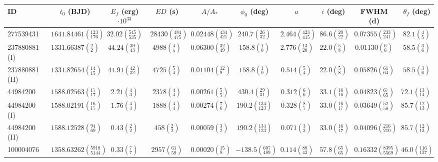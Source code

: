\begin{tabular}{lccccccccr}
\hline\hline
             ID &                              $t_0$ (BJD) &      $E_{f}$ (erg)$\cdot 10^{33}$ &                          $ED$ (s) &                             $A/A_*$ &                     $\phi_0$ (deg) &                               $a$ &                      $i$ (deg) &                              FWHM (d) &                 $\theta_f$ (deg) \\
\hline
      277539431 &    $1641.84461\left(^{123}_{176}\right)$ &  $32.02\left(^{545}_{535}\right)$ &  $28430\left(^{484}_{475}\right)$ &  $0.02448\left(^{434}_{421}\right)$ &     $240.7\left(^{26}_{32}\right)$ &  $2.464\left(^{423}_{415}\right)$ &  $86.6\left(^{20}_{22}\right)$ &    $0.07355\left(^{233}_{241}\right)$ &      $82.1\left(^{4}_{5}\right)$ \\
  237880881 (I) &        $1331.66387\left(^{2}_{2}\right)$ &    $44.24\left(^{39}_{43}\right)$ &       $4988\left(^{4}_{5}\right)$ &    $0.06300\left(^{32}_{49}\right)$ &       $158.8\left(^{1}_{0}\right)$ &    $2.776\left(^{13}_{20}\right)$ &    $22.0\left(^{5}_{8}\right)$ &        $0.01130\left(^{6}_{6}\right)$ &      $58.5\left(^{3}_{6}\right)$ \\
 237880881 (II) &      $1331.82654\left(^{14}_{15}\right)$ &    $41.91\left(^{42}_{32}\right)$ &       $4725\left(^{5}_{4}\right)$ &     $0.01104\left(^{12}_{9}\right)$ &       $158.8\left(^{1}_{0}\right)$ &      $0.514\left(^{5}_{4}\right)$ &    $22.0\left(^{5}_{8}\right)$ &      $0.05826\left(^{61}_{64}\right)$ &      $58.5\left(^{3}_{6}\right)$ \\
       44984200 &      $1588.02563\left(^{17}_{17}\right)$ &       $2.21\left(^{4}_{3}\right)$ &       $2378\left(^{4}_{4}\right)$ &      $0.00261\left(^{5}_{5}\right)$ &     $430.4\left(^{29}_{31}\right)$ &      $0.312\left(^{6}_{6}\right)$ &  $33.1\left(^{16}_{16}\right)$ &      $0.04823\left(^{67}_{65}\right)$ &    $72.1\left(^{13}_{14}\right)$ \\
   44984200 (I) &      $1588.02191\left(^{16}_{17}\right)$ &       $1.76\left(^{4}_{4}\right)$ &       $1888\left(^{4}_{4}\right)$ &      $0.00274\left(^{7}_{6}\right)$ &   $190.2\left(^{134}_{123}\right)$ &      $0.328\left(^{8}_{7}\right)$ &  $33.0\left(^{16}_{17}\right)$ &      $0.03649\left(^{52}_{58}\right)$ &    $85.7\left(^{12}_{13}\right)$ \\
  44984200 (II) &      $1588.12528\left(^{94}_{69}\right)$ &       $0.43\left(^{2}_{2}\right)$ &        $458\left(^{2}_{2}\right)$ &      $0.00059\left(^{3}_{2}\right)$ &   $190.2\left(^{134}_{123}\right)$ &      $0.071\left(^{3}_{3}\right)$ &  $33.0\left(^{16}_{17}\right)$ &    $0.04096\left(^{216}_{210}\right)$ &    $85.7\left(^{12}_{13}\right)$ \\
      100004076 &  $1358.63262\left(^{5918}_{5144}\right)$ &       $0.33\left(^{7}_{7}\right)$ &     $2957\left(^{61}_{59}\right)$ &     $0.00020\left(^{15}_{8}\right)$ &  $-138.5\left(^{607}_{489}\right)$ &    $0.114\left(^{88}_{43}\right)$ &  $57.8\left(^{65}_{65}\right)$ &  $0.16332\left(^{8395}_{5569}\right)$ &  $46.0\left(^{116}_{137}\right)$ \\
\hline

\end{tabular}

